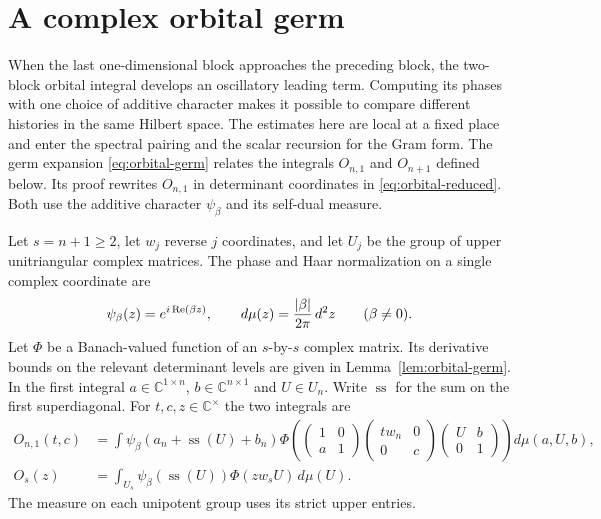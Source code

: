 \section{A complex orbital germ}\label{sec:orbital-germ}
\hypertarget{source-orbital-germ}{}

When the last one-dimensional block approaches the preceding block, the two-block orbital integral develops an oscillatory leading term. Computing its phases with one choice of additive character makes it possible to compare different histories in the same Hilbert space. The estimates
here are local at a fixed place and enter the spectral pairing
and the scalar recursion for the Gram form. The germ expansion \eqref{eq:orbital-germ} relates the integrals \(O_{n,1}\) and \(O_{n+1}\) defined below. Its proof rewrites \(O_{n,1}\) in determinant coordinates in \eqref{eq:orbital-reduced}. Both use the additive character \(\psi_\beta\) and its self-dual measure.

Let \(s=n+1\ge 2\), let \(w_j\) reverse \(j\) coordinates, and let
\(U_j\) be the group of upper unitriangular complex matrices. The phase and Haar normalization on a single complex coordinate are
\[
   \psi_\beta(z)=e^{i\operatorname{Re}(\beta z)},\qquad
   d\mu(z)=\frac{|\beta|}{2\pi}\,d^2z\qquad (\beta\ne0).
\]
Let \(\Phi\) be a Banach-valued function of an \(s\)-by-\(s\) complex matrix. Its derivative bounds on the relevant determinant levels are given in Lemma~\ref{lem:orbital-germ}. In the first integral \(a\in\mathbb C^{1\times n}\), \(b\in\mathbb C^{n\times1}\) and \(U\in U_n\). Write \(\operatorname{ss}\) for the sum on the first superdiagonal. For \(t,c,z\in\mathbb C^\times\) the two integrals are
\[
\begin{aligned}
 O_{n,1}(t,c)&=\int \psi_\beta(a_n+\operatorname{ss}(U)+b_n)
   \Phi\left(\begin{pmatrix}1&0\\a&1\end{pmatrix}
             \begin{pmatrix}tw_n&0\\0&c\end{pmatrix}
             \begin{pmatrix}U&b\\0&1\end{pmatrix}\right)d\mu(a,U,b),\\
 O_s(z)&=\int_{U_s}\psi_\beta(\operatorname{ss}(U))\Phi(zw_sU)\,d\mu(U).
\end{aligned}
\]
The measure on each unipotent group uses its strict upper entries.

